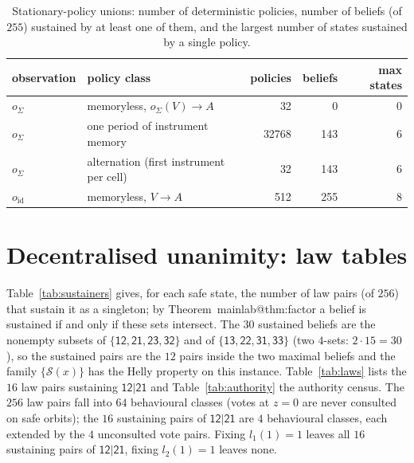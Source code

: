 \documentclass[11pt,a4paper]{article}
\makeatletter
\theoremstyle{plain}
\theoremstyle{definition}
\theoremstyle{remark}
\newcommand{\calS}{\mathcal{S}}
\newcommand{\st}[1]{\mathsf{#1}}
\newcommand{\ofull}{o_{\mathrm{id}}}
\newcommand{\oagg}{o_{\Sigma}}
\newcommand{\mref}[1]{\csname mainlab@#1\endcsname}
\makeatother
\begin{document}
\begin{table}[H]
\centering\small
\caption{Stationary-policy unions: number of deterministic policies, number of beliefs (of $255$) sustained by at least one of them, and the largest number of states sustained by a single policy.}
\label{tab:stationary}
\begin{tabular}{llrrr}
\toprule
observation & policy class & policies & beliefs & max states \\
\midrule
$\oagg$ & memoryless, $\oagg(V)\to A$ & 32 & 0 & 0 \\
$\oagg$ & one period of instrument memory & 32768 & 143 & 6 \\
$\oagg$ & alternation (first instrument per cell) & 32 & 143 & 6 \\
$\ofull$ & memoryless, $V\to A$ & 512 & 255 & 8 \\
\bottomrule
\end{tabular}
\end{table}
\section{Decentralised unanimity: law tables}\label{si:dec}

Table~\ref{tab:sustainers} gives, for each safe state, the number of law pairs (of $256$) that sustain it as a singleton; by Theorem~\mref{thm:factor} a belief is sustained if and only if these sets intersect. The $30$ sustained beliefs are the nonempty subsets of $\{\st{12},\st{21},\st{23},\st{32}\}$ and of $\{\st{13},\st{22},\st{31},\st{33}\}$ (two $4$-sets: $2\cdot 15=30$), so the sustained pairs are the $12$ pairs inside the two maximal beliefs and the family $\{\calS(x)\}$ has the Helly property on this instance. Table~\ref{tab:laws} lists the $16$ law pairs sustaining $\st{12|21}$ and Table~\ref{tab:authority} the authority census. The $256$ law pairs fall into $64$ behavioural classes (votes at $z=0$ are never consulted on safe orbits); the $16$ sustaining pairs of $\st{12|21}$ are $4$ behavioural classes, each extended by the $4$ unconsulted vote pairs. Fixing $l_1(1)=1$ leaves all $16$ sustaining pairs of $\st{12|21}$, fixing $l_2(1)=1$ leaves none.
\end{document}
